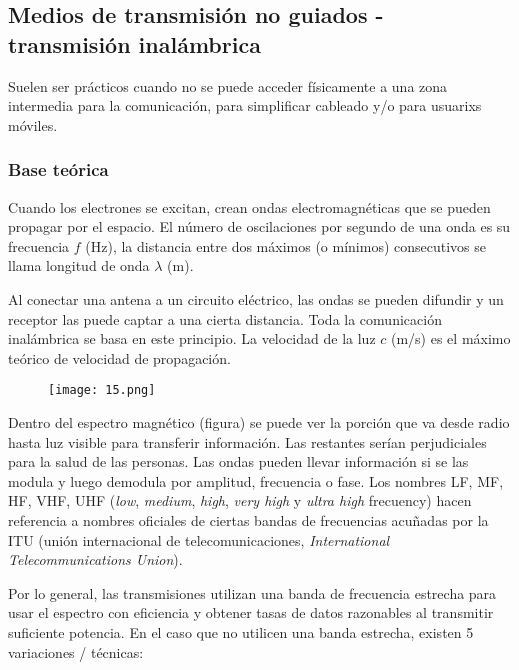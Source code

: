 \documentclass{book}
\begin{document}
	\pagebreak
	\subsection{Medios de transmisión no guiados - transmisión inalámbrica}
	Suelen ser prácticos cuando no se puede acceder físicamente a una zona intermedia para la comunicación, para simplificar cableado y/o para usuarixs móviles.
	
	\subsubsection{Base teórica}
	Cuando los electrones se excitan, crean ondas electromagnéticas que se pueden propagar por el espacio. El número de oscilaciones por segundo de una onda es su frecuencia $f$ (Hz), la distancia entre dos máximos (o mínimos) consecutivos se llama longitud de onda $\lambda$ (m).
	
	\vspace{3mm}
	Al conectar una antena a un circuito eléctrico, las ondas se pueden difundir y un receptor las puede captar a una cierta distancia. Toda la comunicación inalámbrica se basa en este principio. La velocidad de la luz $c$ (m/s) es el máximo teórico de velocidad de propagación.
	
	\begin{figure}[H]
		\centering
		\texttt{[image: 15.png]}
	\end{figure}
	
	Dentro del espectro magnético (figura) se puede ver la porción que va desde radio hasta luz visible para transferir información. Las restantes serían perjudiciales para la salud de las personas. Las ondas pueden llevar información si se las modula y luego demodula por amplitud, frecuencia o fase. Los nombres LF, MF, HF, VHF, UHF (\textit{low}, \textit{medium}, \textit{high}, \textit{very high} y \textit{ultra high} frecuency) hacen referencia a nombres oficiales de ciertas bandas de frecuencias acuñadas por la ITU (unión internacional de telecomunicaciones, \textit{International Telecommunications Union}).
	
	\vspace{3mm}
	Por lo general, las transmisiones utilizan una banda de frecuencia estrecha para usar el espectro con eficiencia y obtener tasas de datos razonables al transmitir suficiente potencia. En el caso que no utilicen una banda estrecha, existen 5 variaciones / técnicas:
	
\end{document}
